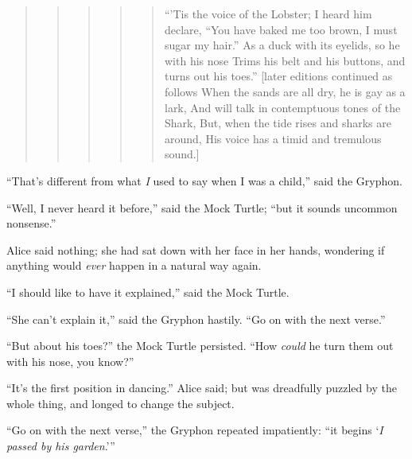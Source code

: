 \documentclass[11pt,openany,oneside]{book}
\begin{document}
\begin{quote}
\begin{quote}
\begin{quote}
\begin{quote}
\begin{quote}
{\small “’Tis the voice of the Lobster; I heard him declare,}\newline
{\small  “You have baked me too brown, I must sugar my hair.”}\newline
{\small  As a duck with its eyelids, so he with his nose}\newline
{\small  Trims his belt and his buttons, and turns out his toes.”}\newline
{\small  }\newline
{\small  [later editions continued as follows}\newline
{\small  When the sands are all dry, he is gay as a lark,}\newline
{\small  And will talk in contemptuous tones of the Shark,}\newline
{\small  But, when the tide rises and sharks are around,}\newline
{\small  His voice has a timid and tremulous sound.] }

\end{quote}
\end{quote}
\end{quote}
\end{quote}
\end{quote}
“That’s different from what {\em I\/} used to say when I was a child,” said the Gryphon. 

“Well, I never heard it before,” said the Mock Turtle; “but it sounds uncommon nonsense.” 

Alice said nothing; she had sat down with her face in her hands, wondering if anything would {\em ever\/} happen in a natural way again. 

“I should like to have it explained,” said the Mock Turtle. 

“She can’t explain it,” said the Gryphon hastily. “Go on with the next verse.” 

“But about his toes?” the Mock Turtle persisted. “How {\em could\/} he turn them out with his nose, you know?” 

“It’s the first position in dancing.” Alice said; but was dreadfully puzzled by the whole thing, and longed to change the subject. 

“Go on with the next verse,” the Gryphon repeated impatiently: “it begins ‘{\em I passed by his garden\/}.’” 
\end{document}

